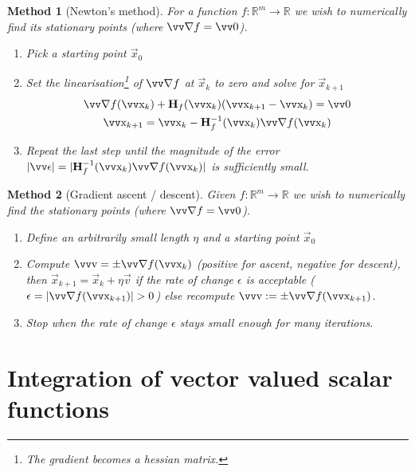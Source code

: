 \documentclass[twocolumn, margin=normal]{tex/hsrzf}
\theoremstyle{fuvarzf}
\newtheorem{method}{Method}
\begin{document}
\begin{method}[Newton's method]
  For a function \(f:\mathbb{R}^m\to\mathbb{R}\) we wish to numerically find
  its stationary points (where \(\grad f = \vec{0}\)).
  \begin{enumerate}
    \item Pick a starting point \(\vec{x}_0\)
    \item Set the linearisation\footnote{The gradient becomes a hessian matrix.}
      of \(\grad f\) at \(\vec{x}_k\) to zero and
      solve for \(\vec{x}_{k+1}\)
      \begin{gather*}
        \grad f(\vec{x}_k) + \mx{H}_f (\vec{x}_k)
          (\vec{x}_{k+1} - \vec{x}_k) = \vec{0} \\
          \vec{x}_{k+1} = \vec{x}_k - \mx{H}_f^{-1} (\vec{x}_k) \grad f(\vec{x}_k)
      \end{gather*}
    \item Repeat the last step until the magnitude of the error
      \(|\vec{\epsilon}| = |\mx{H}_f^{-1} (\vec{x}_k) \grad f(\vec{x}_k)|\) is
      sufficiently small.
  \end{enumerate}
\end{method}

\begin{method}[Gradient ascent / descent]
  Given \(f:\mathbb{R}^m\to\mathbb{R}\) we wish to numerically find
  the stationary points (where \(\grad f = \vec{0}\)).
  \begin{enumerate}
    \item Define an arbitrarily small length \(\eta\) and a starting point
      \(\vec{x}_0\)
    \item Compute \(\vec{v} = \pm\grad f(\vec{x}_k)\) (positive for ascent,
      negative for descent), then \(\vec{x}_{k+1} = \vec{x}_k + \eta\vec{v}\)
      if the rate of change \(\epsilon\) is acceptable (\(\epsilon = |\grad
      f(\vec{x}_{k+1})| > 0\)) else recompute \(\vec{v} := \pm \grad
      f(\vec{x}_{k+1})\).
    \item Stop when the rate of change \(\epsilon\) stays small enough for many
      iterations.
  \end{enumerate}
\end{method}

\section{Integration of vector valued scalar functions}
\end{document}
